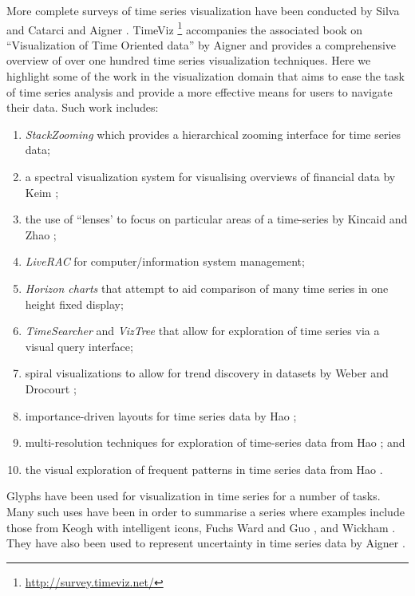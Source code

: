 More complete surveys of time series visualization have been conducted by Silva and Catarci \cite{Silva00} and Aigner \etal \cite{Aigner07}.
TimeViz \footnote{\url{http://survey.timeviz.net/}} accompanies the associated book on ``Visualization of Time Oriented data'' by Aigner \etal \cite{aigner2011visualization} and provides a comprehensive overview of over one hundred time series visualization techniques.
Here we highlight some of the work in the visualization domain that aims to ease the task of time series analysis and provide a more effective means for users to navigate their data.
Such work includes:
\begin{enumerate}
\item \emph{StackZooming} \cite{javedstack2010} which provides a hierarchical zooming interface for time series data;
\item a spectral visualization system for visualising overviews of financial data by Keim \etal \cite{Keim:2006};
\item the use of ``lenses' to focus on particular areas of a time-series by Kincaid \etal \cite{kincaidsignallens:2010} and Zhao \etal \cite{zhaoexploratory2011};
\item \emph{LiveRAC} \cite{mclachlanliverac:2008} for computer/information system management;
\item \emph{Horizon charts} \cite{Heer09} that attempt to aid comparison of many time series in one height fixed display;
\item \emph{TimeSearcher} \cite{hochheiser2001} and \emph{VizTree} \cite{lin2005} that allow for exploration of time series via a visual query interface;
\item spiral visualizations to allow for trend discovery in datasets by Weber \etal \cite{weber2001} and Drocourt \etal \cite{Drocourt11};
\item importance-driven layouts for time series data by Hao \etal \cite{haoimportance-driven2005};
\item multi-resolution techniques for exploration of time-series data from Hao \etal \cite{haomulti-resolution2007}; and
\item the visual exploration of frequent patterns in time series data from Hao \etal \cite{haovisual2012}. 
\end{enumerate}

Glyphs have been used for visualization in time series for a number of tasks.
Many such uses have been in order to summarise a series where examples include those from Keogh \etal with intelligent icons\cite{keoghintelligent2006}, Fuchs \etal \cite{fuchsevaluation2013} Ward and Guo \cite{ward2011}, and Wickham \etal \cite{wickham2012}.
They have also been used to represent uncertainty in time series data by Aigner \etal \cite{aigner05planningLines}. 

